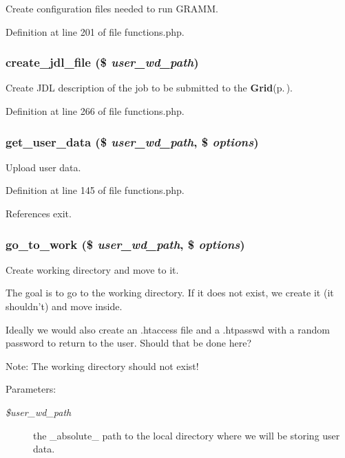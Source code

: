Create configuration files needed to run GRAMM. 



Definition at line 201 of file functions.php.
\subsubsection{\setlength{\rightskip}{0pt plus 5cm}create\_\-jdl\_\-file (\$ {\em user\_\-wd\_\-path})}\label{functions_8php_a6}


Create JDL description of the job to be submitted to the {\bf Grid}{\rm (p.\,\pageref{classGrid})}. 



Definition at line 266 of file functions.php.
\subsubsection{\setlength{\rightskip}{0pt plus 5cm}get\_\-user\_\-data (\$ {\em user\_\-wd\_\-path}, \$ {\em options})}\label{functions_8php_a4}


Upload user data. 



Definition at line 145 of file functions.php.

References exit.
\subsubsection{\setlength{\rightskip}{0pt plus 5cm}go\_\-to\_\-work (\$ {\em user\_\-wd\_\-path}, \$ {\em options})}\label{functions_8php_a1}


Create working directory and move to it. 

The goal is to go to the working directory. If it does not exist, we create it (it shouldn't) and move inside.

Ideally we would also create an .htaccess file and a .htpasswd with a random password to return to the user. Should that be done here?

\begin{Desc}
\item[Note:]The working directory should not exist!\end{Desc}
\begin{Desc}
\item[Parameters:]
\begin{description}
\item[{\em \$user\_\-wd\_\-path}]the \_\-absolute\_\- path to the local directory where we will be storing user data. \end{description}
\end{Desc}


